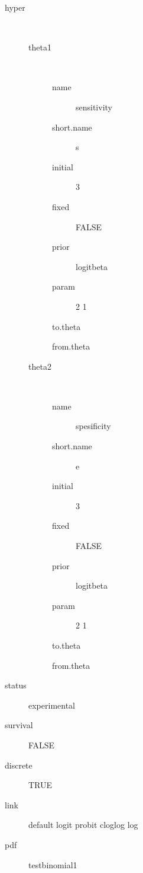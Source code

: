 \begin{description}
	\item[hyper]\ 
	 \begin{description}
	 	\item[theta1]\ 
	 	 \begin{description}
	 	 	 \item[ name ] sensitivity 
	 	 	 \item[ short.name ] s 
	 	 	 \item[ initial ] 3 
	 	 	 \item[ fixed ] FALSE 
	 	 	 \item[ prior ] logitbeta 
	 	 	 \item[ param ] 2 1 
	 	 	 \item[ to.theta ] \verb|| 
	 	 	 \item[ from.theta ] \verb|| 
	 	 \end{description}
	 	\item[theta2]\ 
	 	 \begin{description}
	 	 	 \item[ name ] spesificity 
	 	 	 \item[ short.name ] e 
	 	 	 \item[ initial ] 3 
	 	 	 \item[ fixed ] FALSE 
	 	 	 \item[ prior ] logitbeta 
	 	 	 \item[ param ] 2 1 
	 	 	 \item[ to.theta ] \verb|| 
	 	 	 \item[ from.theta ] \verb|| 
	 	 \end{description}
	 \end{description}
	 \item[ status ] experimental 
	 \item[ survival ] FALSE 
	 \item[ discrete ] TRUE 
	 \item[ link ] default logit probit cloglog log 
	 \item[ pdf ] testbinomial1 
\end{description}
